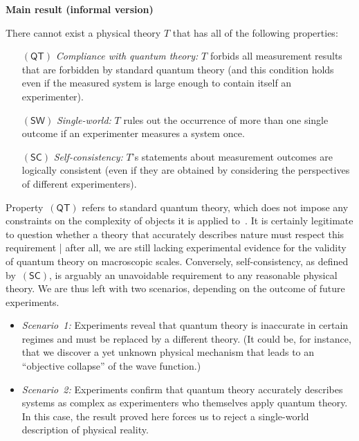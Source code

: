 \documentclass{article}
\theoremstyle{plain}
\theoremstyle{definition}
\newcommand*{\QT}{\mathsf{(QT)}}
\newcommand*{\SW}{\mathsf{(SW)}}
\newcommand*{\SelfCons}{\mathsf{(SC)}}
\begin{document}
 \begin{shaded}
 \noindent \textbf{Main result (informal version)} \vspace{1ex}

 \noindent There cannot exist a physical theory $T$ that has all of the following properties: \vspace{-0.8ex}
  \begin{enumerate}[itemindent=0cm,labelsep=0.2cm,leftmargin=1.0cm] 
    \setlength{\itemsep}{0ex}
    \item[$\QT$]   \emph{Compliance with quantum theory:} $T$ forbids all measurement results that are forbidden by standard quantum theory (and this condition holds even if the measured system is large enough to contain itself an experimenter).
    \item[$\SW$]  \emph{Single-world:} $T$ rules out the occurrence of more than one single outcome if an experimenter measures a system once.
          \item[$\SelfCons$]  \emph{Self-consistency:} $T$'s statements about measurement outcomes are logically consistent (even if they are obtained by considering the perspectives of different experimenters).
              \end{enumerate} \vspace{-2ex}
 \end{shaded}
 
Property~$\QT$ refers to standard quantum theory, which does not impose any constraints on the complexity of objects it is applied to~\cite{Deutsch85}.  It is certainly legitimate to question whether a theory that accurately describes nature must respect this requirement | after all, we are still lacking experimental evidence for the validity of quantum theory on macroscopic scales.  Conversely, self-consistency, as defined by~$\SelfCons$, is arguably an unavoidable requirement to any reasonable physical theory.  We are thus left with two scenarios, depending on the outcome of future experiments. 
\begin{itemize}
  \item \emph{Scenario~1:} Experiments reveal that quantum theory is inaccurate in certain regimes and must be replaced by a different theory. (It could be, for instance, that we discover a yet unknown physical mechanism that leads to an ``objective collapse'' of the wave function.)
  \item \emph{Scenario~2:} Experiments confirm that quantum theory accurately describes systems as complex as experimenters who themselves apply quantum theory.  In this case, the result proved here forces us to reject a single-world description of physical reality. 
 \end{itemize}
\end{document}
